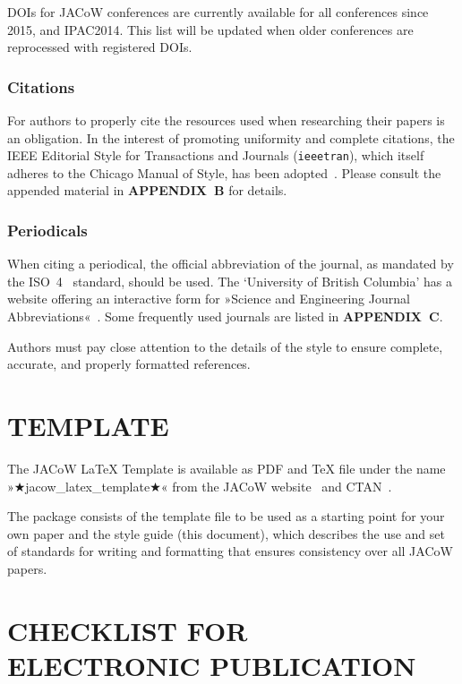 \documentclass[%
               hyphens,       %
               ]{jacow}
\begin{document}
DOIs for JACoW conferences are currently available for all conferences since 2015, 
and IPAC2014.
This list will be updated when older conferences are reprocessed with registered DOIs.

\subsubsection{Citations}

For authors to properly cite the resources used when researching
their papers is an obligation. In the interest of
promoting uniformity and complete citations, the IEEE
Editorial Style for Transactions and Journals (\texttt{ieeetran}), which itself 
adheres to the Chicago Manual of Style, has been adopted~\cite{IEEE}. 
Please consult the appended material in \textbf{APPENDIX~B} for details. 

\subsubsection{Periodicals}

When citing a periodical, the official abbreviation of the journal, 
as mandated by the ISO~4~\cite{ISO4} standard, should be used.
The ‘University of British Columbia’ has a website offering an interactive form for
»Science and Engineering Journal Abbreviations«~\cite{journal-abbreviations}. 
Some frequently used journals are listed in \textbf{APPENDIX~C}.

Authors must pay close attention to the details of the style 
to ensure complete, accurate, and properly formatted references.

\vspace*{-\baselineskip}
\section{TEMPLATE}

The JACoW {\LaTeX} Template is available as PDF and TeX file under the name »★jacow_latex_template★« 
from the JACoW website~\cite{jacow-template} and CTAN~\cite{ctan-jacow}. 

The package consists of the template file to be used as a starting point for your own paper
and the style guide (this document), which describes the use and set of standards for writing and formatting that ensures consistency over all JACoW papers.

\section{CHECKLIST FOR\\ ELECTRONIC PUBLICATION}
\end{document}
